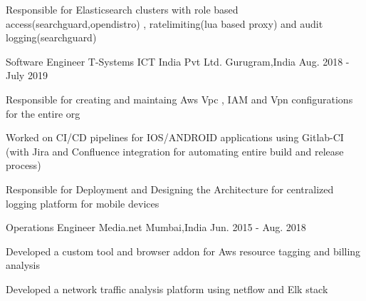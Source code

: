 \begin{cventries}
{\begin{cvitems}
               \item { Responsible for Elasticsearch clusters with role based access(searchguard,opendistro) , ratelimiting(lua based proxy) and audit logging(searchguard)} 		
	  \end{cvitems}
    }
    \cventry
    {Software Engineer} %
    {T-Systems ICT India Pvt Ltd.} %
    {Gurugram,India} %
    {Aug. 2018 - July 2019} %
    {
      \begin{cvitems} %
	  \item { Responsible for creating and maintaing Aws Vpc , IAM and Vpn configurations for the entire org}
		\item {Worked on CI/CD pipelines for IOS/ANDROID applications using Gitlab-CI (with Jira and Confluence integration for automating entire build and release process)}
		\item  { Responsible for Deployment and Designing the  Architecture for centralized logging platform for mobile devices}                  
	  \end{cvitems}
    }

  \cventry
    {Operations Engineer} %
    {Media.net} %
    {Mumbai,India} %
    {Jun. 2015 - Aug. 2018} %
    {
      \begin{cvitems} %
	    \item {Developed a custom tool and browser addon for Aws resource tagging and billing analysis }
		  \item {Developed a network traffic analysis platform using netflow and Elk stack }
      \end{cvitems}
    }

\end{cventries}

